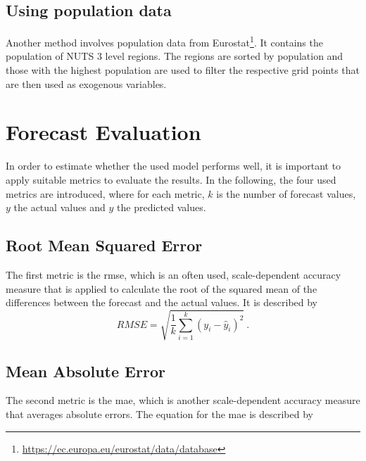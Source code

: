 \subsection*{Using population data}

Another method involves population data from Eurostat\footnote{\url{https://ec.europa.eu/eurostat/data/database}}. It contains the population of NUTS 3 level regions. The regions are sorted by population and those with the highest population are used to filter the respective grid points that are then used as exogenous variables.\\


\section{Forecast Evaluation}
\label{sec:fceval}

In order to estimate whether the used model performs well, it is important to apply suitable metrics to evaluate the results. In the following, the four used metrics are introduced, where for each metric, $k$ is the number of forecast values, $y$ the actual values and $\hat{y}$ the predicted values.\\

\subsection*{Root Mean Squared Error}

The first metric is the \gls{rmse}, which is an often used, scale-dependent accuracy measure that is applied to calculate the root of the squared mean of the differences between the forecast and the actual values. It is described by\\

\begin{equation}
RMSE = \sqrt{\frac{1}{k} \sum_{i=1}^{k} (y_i-\hat{y}_i)^2}~.
\label{eq:rmse}
\end{equation}

\subsection*{Mean Absolute Error}

The second metric is the \gls{mae}, which is another scale-dependent accuracy measure that averages absolute errors. The equation for the \gls{mae} is described by\\

